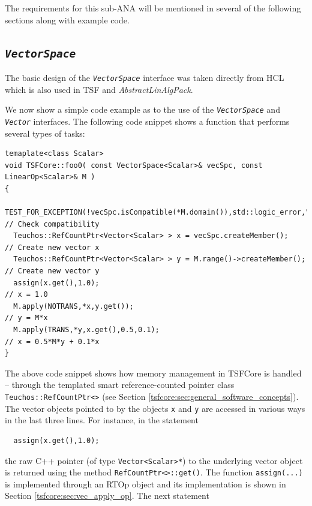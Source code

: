 The requirements for this sub-ANA will be mentioned in several of the
following sections along with example code.

%
\subsection{\texttt{\textit{VectorSpace}}}
\label{tsfcore:sec:vec_space}
%

The basic design of the \texttt{\textit{VectorSpace}} interface was
taken directly from HCL which is also used in TSF and
\textit{AbstractLinAlgPack}.

We now show a simple code example as to the use of the
\texttt{\textit{VectorSpace}} and
\texttt{\textit{Vector}} interfaces.  The following code snippet shows
a function that performs several types of tasks:

{\scriptsize\begin{verbatim}
temaplate<class Scalar>
void TSFCore::foo0( const VectorSpace<Scalar>& vecSpc, const LinearOp<Scalar>& M )
{
  TEST_FOR_EXCEPTION(!vecSpc.isCompatible(*M.domain()),std::logic_error,"Error!"); // Check compatibility
  Teuchos::RefCountPtr<Vector<Scalar> > x = vecSpc.createMember();                 // Create new vector x
  Teuchos::RefCountPtr<Vector<Scalar> > y = M.range()->createMember();             // Create new vector y
  assign(x.get(),1.0);                                                             // x = 1.0
  M.apply(NOTRANS,*x,y.get());                                                     // y = M*x
  M.apply(TRANS,*y,x.get(),0.5,0.1);                                               // x = 0.5*M*y + 0.1*x
}
\end{verbatim}}

{}\noindent{}The above code snippet shows how memory management in TSFCore is
handled -- through the templated smart reference-counted pointer class
\texttt{Teuchos\-::RefCountPtr<>} (see Section
\ref{tsfcore:sec:general_software_concepts}).  The vector objects pointed
to by the objects \texttt{x} and \texttt{y} are accessed in various
ways in the last three lines.  For instance, in the statement

{\scriptsize\begin{verbatim}
  assign(x.get(),1.0);
\end{verbatim}}

\noindent
the raw C++ pointer (of type \texttt{Vector<Scalar>*}) to the
underlying vector object is returned using the method
\texttt{RefCountPtr<>\-::get()}.  The function
\texttt{assign(...)} is implemented through an RTOp object and its
implementation is shown in Section \ref{tsfcore:sec:vec_apply_op}.
The next statement

